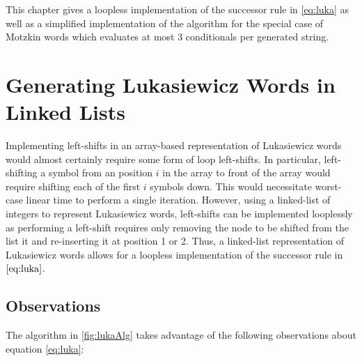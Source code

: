 This chapter gives a loopless implementation of the successor rule in \ref{eq:luka} as well as a simplified implementation of the algorithm for the special case of Motzkin words which evaluates at most 3 conditionals per generated string. 


\section{Generating Lukasiewicz Words in Linked Lists}
Implementing left-shifts in an array-based representation of Lukasiewicz words would almost certainly require some form of loop left-shifts.  In particular, left-shifting a symbol from an position $i$ in the array to front of the array would require shifting each of the first $i$ symbols down.  This would necessitate worst-case linear time to perform a single iteration. 
However, using a linked-list of integers to represent Lukasiewicz words, left-shifts can be implemented looplessly as performing a left-shift requires only removing the node to be shifted from the list it and re-inserting it at position 1 or 2.  Thus, a linked-list representation of Lukasiewicz words allows for a loopless implementation of the successor rule in $\ref{eq:luka}$.

\subsection{Observations}
The algorithm in \ref{fig:lukaAlg} takes advantage of the following observations about equation \ref{eq:luka}:

